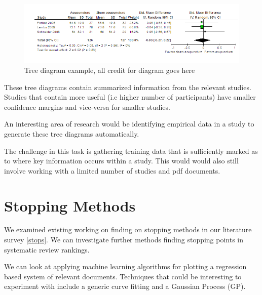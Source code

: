 \begin{figure}[H]
\center
\includegraphics[width=16cm]{figures/tree.png}
\caption{Tree diagram example, all credit for diagram goes here \cite{Manheimer2012}}
\end{figure}

These tree diagrams contain summarized information from the relevant studies. Studies that contain more useful (i.e higher number of participants) have smaller confidence margins and vice-versa for smaller studies.

An interesting area of research would be identifying empirical data in a study to generate these tree diagrams automatically.

The challenge in this task is gathering training data that is sufficiently marked as to where key information occurs within a study. This would would also still involve working with a limited number of studies and pdf documents.

\section{Stopping Methods} \label{sm}

We examined existing working on finding on stopping methods in our literature survey \ref{stops}. We can investigate further methods finding stopping points in systematic review rankings. 

We can look at applying machine learning algorithms for plotting a regression based system of relevant documents. Techniques that could be interesting to experiment with include a generic curve fitting and a Gaussian Process (GP).
